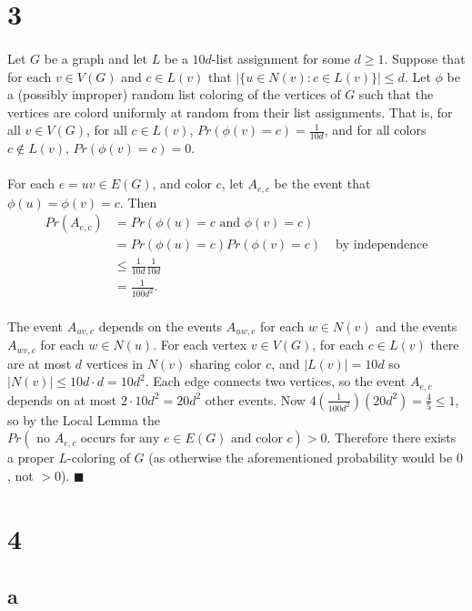 \documentclass[letterpaper,12pt,oneside,onecolumn]{report}
\begin{document}
\section*{3}
\paragraph{}
Let $G$ be a graph and let $L$ be a $10d$-list assignment for some $d \geq 1$. Suppose that for each $v \in V(G)$ and $c \in L(v)$ that $|\{ u \in N(v) : c \in L(v) \}| \leq d$. Let $\phi$ be a (possibly improper) random list coloring of the vertices of $G$ such that the vertices are colord uniformly at random from their list assignments. That is, for all $v \in V(G)$, for all $c \in L(v)$, $Pr(\phi(v) = c) = \frac{1}{10d}$, and for all colors $c \not\in L(v)$, $Pr(\phi(v) = c) = 0$.
\paragraph{}
For each $e = uv \in E(G)$, and color $c$, let $A_{e,c}$ be the event that $\phi(u) = \phi(v) = c$. Then 
\begin{align*}
Pr(A_{e,c}) &= Pr(\phi(u) = c \text{ and } \phi(v) = c) \\
&= Pr(\phi(u) = c)Pr(\phi(v) = c) &\text{ by independence} \\
&\leq \frac{1}{10d}\frac{1}{10d} \\
&= \frac{1}{100d^2}.
\end{align*}
\paragraph{}
The event $A_{uv,c}$ depends on the events $A_{uw, c}$ for each $w \in N(v)$ and the events $A_{wv,c}$ for each $w \in N(u)$. For each vertex $v \in V(G)$, for each $c \in L(v)$ there are at most $d$ vertices in $N(v)$ sharing color $c$, and $|L(v)| = 10d$ so $|N(v)| \leq 10d\cdot d = 10d^2$. Each edge connects two vertices, so the event $A_{e,c}$ depends on at most $2\cdot 10d^2 = 20d^2$ other events. Now $4(\frac{1}{100d^2})(20d^2) = \frac{4}{5} \leq 1$, so by the Local Lemma the $Pr(\text{ no } A_{e,c} \text{ occurs for any }e\in E(G)\text{ and color }c) > 0$. Therefore there exists a proper $L$-coloring of $G$ (as otherwise the aforementioned probability would be $0$, not $>0$). $\blacksquare$
\section*{4}
\subsection*{a}
\end{document}
